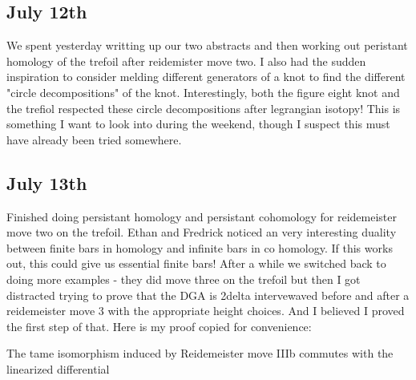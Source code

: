 \documentclass[11pt,oneside]{amsart}
\begin{document}
\subsection{July 12th}

We spent yesterday writting up our two abstracts and then working out peristant homology of the trefoil after reidemister move two. I also had the sudden inspiration to consider melding different generators of a knot to find the different "circle decompositions" of the knot. Interestingly, both the figure eight knot and the trefiol respected these circle decompositions after legrangian isotopy! This is something I want to look into during the weekend, though I suspect this must have already been tried somewhere.


\subsection{July 13th}

Finished doing persistant homology and persistant cohomology for reidemeister move two on the trefoil. Ethan and Fredrick noticed an very interesting duality between finite bars in homology and infinite bars in co homology. If this works out, this could give us essential finite bars! After a while we switched back to doing more examples - they did move three on the trefoil but then I got distracted trying to prove that the DGA is 2delta intervewaved before and after a reidemeister move 3 with the appropriate height choices. And I believed I proved the first step of that. Here is my proof copied for convenience: 


\begin{theorem}

The tame isomorphism induced by Reidemeister move IIIb commutes with the linearized differential

\end{theorem}
\end{document}
